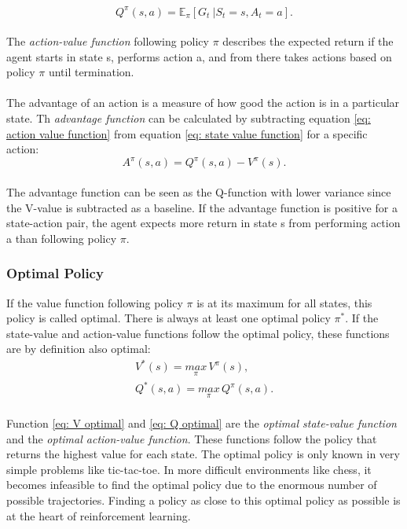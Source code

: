 \begin{equation}
    Q^\pi(s,a) = \mathbb{E}_\pi[G_t\ |S_t = s, A_t = a].
    \label{eq: action value function}
\end{equation}
\\[-3mm]
\noindent
The \textit{action-value function} following policy $\pi$ describes the expected return if the agent starts in state s, performs action a, and from there takes actions based on policy $\pi$ until termination. 
\\\\
The advantage of an action is a measure of how good the action is in a particular state. Th \textit{advantage function} can be calculated by subtracting equation \ref{eq: action value function} from equation \ref{eq: state value function} for a specific action: 
\\[-3mm]
\begin{equation}
    A^\pi(s,a) = Q^\pi(s,a) - V^\pi(s).
\end{equation}
\\[-2mm]
\noindent
The advantage function can be seen as the Q-function with lower variance since the V-value is subtracted as a baseline. If the advantage function is positive for a state-action pair, the agent expects more return in state s from performing action a than following policy $\pi$.

\subsubsection*{Optimal Policy}

If the value function following policy $\pi$ is at its maximum for all states, this policy is called optimal. There is always at least one optimal policy $\pi^*$.  If the state-value and action-value functions follow the optimal policy, these functions are by definition also optimal:
\\[-4mm]
\begin{gather}
        \label{eq: V optimal}
        V^*(s) =  \underset{\pi}{max} \, V^\pi(s), \\ 
        Q^*(s,a) =  \underset{\pi}{max} \, Q^\pi(s, a).
        \label{eq: Q optimal}
\end{gather}
\\[-2mm]
\noindent
Function \ref{eq: V optimal}  and \ref{eq: Q optimal} are the \textit{optimal state-value function} and the \textit{optimal action-value function}. These functions follow the policy that returns the highest value for each state. The optimal policy is only known in very simple problems like tic-tac-toe. In more difficult environments like chess, it becomes infeasible to find the optimal policy due to the enormous number of possible trajectories. Finding a policy as close to this optimal policy as possible is at the heart of reinforcement learning. 

